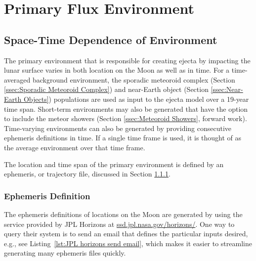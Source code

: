 \documentclass{article}
\begin{document}
\section{Primary Flux Environment}



\subsection{Space-Time Dependence of Environment}

The primary environment that is responsible for creating ejecta by impacting the lunar surface varies in both location on the Moon as well as in time. For a time-averaged background environment, the sporadic meteoroid complex (Section \ref{ssec:Sporadic Meteoroid Complex}) and near-Earth object (Section \ref{ssec:Near-Earth Objects}) populations are used as input to the ejecta model over a 19-year time span. Short-term environments may also be generated that have the option to include the meteor showers (Section \ref{ssec:Meteoroid Showers}, forward work). Time-varying environments can also be generated by providing consecutive ephemeris definitions in time. If a single time frame is used, it is thought of as the average environment over that time frame.

The location and time span of the primary environment is defined by an ephemeris, or trajectory file, discussed in Section \ref{sssec:Ephemeris Definition}.

\subsubsection{Ephemeris Definition}\label{sssec:Ephemeris Definition}

The ephemeris definitions of locations on the Moon are generated by using the service provided by JPL Horizons at \url{ssd.jpl.nasa.gov/horizons/}. One way to query their system is to send an email that defines the particular inputs desired, e.g., see Listing~\ref{lst:JPL horizons send email}, which makes it easier to streamline generating many ephemeris files quickly.


\end{document}
